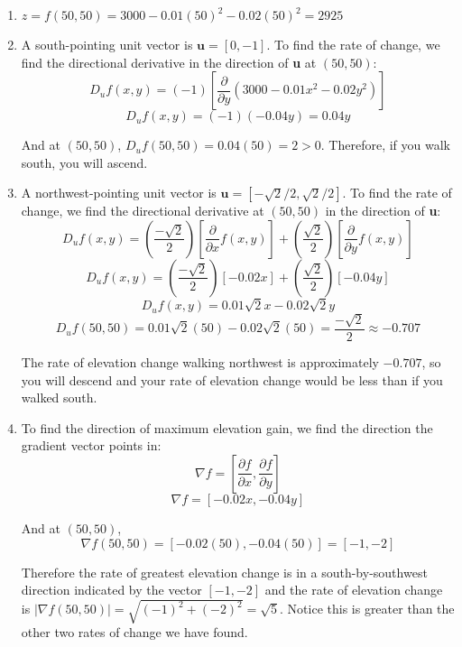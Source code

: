\begin{Answer}[ref = maximum]
\begin{enumerate}
    \item $z = f(50, 50) = 3000 - 0.01(50)^2 - 0.02(50)^2 = 2925$
    \item A south-pointing unit vector is $\textbf{u} = \left[ 0, -1 \right]$. 
    To find the rate of change, we find the directional derivative in the 
    direction of \textbf{u} at $(50, 50)$:
    $$D_u f(x, y) = \left( -1 \right) \left[ \frac{\partial}{\partial y} 
    \left( 3000 - 0.01x^2 - 0.02y^2 \right) \right]$$
    $$D_u f(x, y) = \left( -1 \right) \left( -0.04 y \right) = 0.04y$$

    And at $(50, 50)$, $D_u f(50, 50) = 0.04(50) = 2 > 0$. Therefore, if you 
    walk south, you will ascend.
    \item A northwest-pointing unit vector is $\textbf{u} = \left[ -\sqrt{2}
    /2, \sqrt{2}/2 \right]$. To find the rate of change, we find the 
    directional derivative at $(50, 50)$ in the direction of \textbf{u}:
    $$D_u f(x, y) = \left( \frac{-\sqrt{2}}{2} \right) \left[ \frac{\partial}{
    \partial x} f(x, y) \right] + \left( \frac{\sqrt{2}}{2} \right) \left[ 
    \frac{\partial}{\partial y} f(x, y) \right]$$
    $$D_u f(x, y) = \left( \frac{-\sqrt{2}}{2} \right) \left[ -0.02x \right] 
    + \left( \frac{\sqrt{2}}{2} \right) \left[ -0.04 y \right]$$
    $$D_u f(x, y) = 0.01\sqrt{2}x - 0.02\sqrt{2}y$$
    $$D_u f(50, 50) = 0.01 \sqrt{2} \left( 50 \right) - 0.02 \sqrt{2} \left( 
    50 \right) = \frac{-\sqrt{2}}{2} \approx -0.707$$

    The rate of elevation change walking northwest is approximately $-0.707$, 
    so you will descend and your rate of elevation change would be less than 
    if you walked south. 

    \item To find the direction of maximum elevation gain, we find the 
    direction the gradient vector points in:
    $$\nabla f = \left[ \frac{\partial f}{\partial x}, \frac{\partial f}{
    \partial y} \right]$$
    $$\nabla f = \left[ -0.02x, -0.04y \right]$$

    And at $(50, 50)$, 
    $$\nabla f(50, 50) = \left[ -0.02(50), -0.04(50) \right] = \left[ -1, -2 
    \right]$$

    Therefore the rate of greatest elevation change is in a south-by-southwest 
    direction indicated by the vector $\left[ -1, -2 \right]$ and the rate of 
    elevation change is $\left| \nabla f(50, 50) \right| = \sqrt{(-1)^2 + (-2)^
    2} = \sqrt{5}$. Notice this is greater than the other two rates of change 
    we have found. 
\end{enumerate}
\end{Answer}

